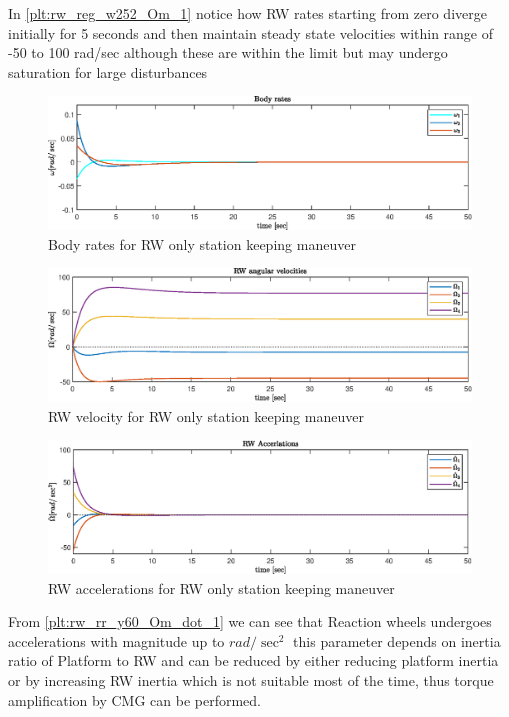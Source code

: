 \noindent In \autoref{plt:rw_reg_w252_Om_1} notice how RW rates starting from zero diverge initially for 5 seconds and then maintain steady state velocities within range of -50 to 100 rad/sec although these are within the limit but may undergo saturation for large disturbances

\begin{figure}[H]
    \centering
    \includegraphics[width=0.9\columnwidth]{figures/plots/RW/rw_reg_w252_w.eps}
    \caption{Body rates for RW only station keeping maneuver}
    \label{plt:rw_reg_w252_w_1}
\end{figure}


\begin{figure}[H]
    \centering
    \includegraphics[width=0.9\columnwidth]{figures/plots/RW/rw_reg_w252_Om.eps}
    \caption{RW velocity for RW only station keeping maneuver}
    \label{plt:rw_reg_w252_Om_1}
\end{figure}

\begin{figure}[H]
    \centering
    \includegraphics[width=0.9\columnwidth]{figures/plots/RW/rw_reg_w252_Om_dot.eps}
    \caption{RW accelerations for RW only station keeping maneuver}
    \label{plt:rw_rw_reg_w252_Om_dot_1}
\end{figure}
\noindent From \autoref{plt:rw_rr_y60_Om_dot_1} we can see that Reaction wheels undergoes accelerations with magnitude up to $rad /\sec^2$ this parameter depends on inertia ratio of Platform to RW and can be reduced by either reducing platform inertia or by increasing RW inertia which is not suitable most of the time, thus torque amplification by CMG can be performed.
